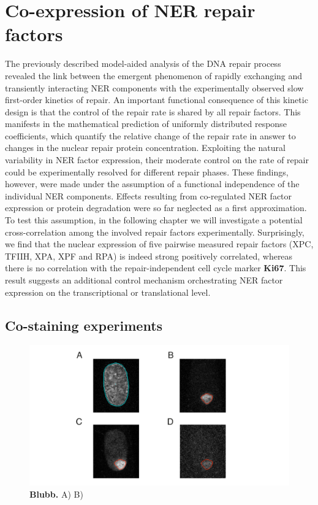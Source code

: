 \chapter{Co-expression of NER repair factors}
The previously described model-aided analysis of the DNA repair process revealed the link between the emergent phenomenon of rapidly exchanging and transiently interacting NER components with the experimentally observed slow first-order kinetics of repair. An important functional consequence of this kinetic design is that the control of the repair rate is shared by all repair factors. This manifests in the mathematical prediction of uniformly distributed response coefficients, which quantify the relative change of the repair rate in answer to changes in the nuclear repair protein concentration. Exploiting the natural variability in NER factor expression, their moderate control on the rate of repair could be experimentally resolved for different repair phases. These findings, however, were made under the assumption of a functional independence of the individual NER components. Effects resulting from co-regulated NER factor expression or protein degradation were so far neglected as a first approximation.  \\
To test this assumption, in the following chapter we will investigate a potential cross-correlation among the involved repair factors experimentally. Surprisingly, we find that the nuclear expression of five pairwise measured repair factors (XPC, TFIIH, XPA, XPF and RPA) is indeed strong positively correlated, whereas there is no correlation with the repair-independent cell cycle marker \textbf{Ki67}. This result suggests an additional control mechanism orchestrating NER factor expression on the transcriptional or translational level.    

  


 




\section{Co-staining experiments}

\begin{figure}[htbp]
	\begin{center}
		\includegraphics[width=1\textwidth]{Abbildungen/figure4_1.pdf}
		\caption{\textbf{Blubb.} A) B) }
		\label{fig:coStaining}
	\end{center}
\end{figure}

